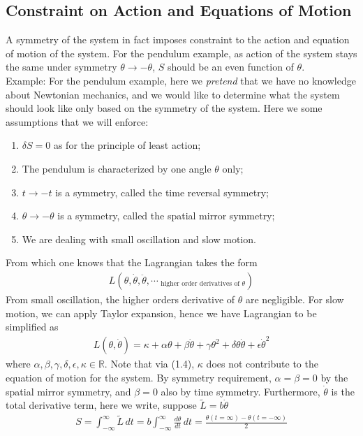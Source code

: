 \documentclass[11pt, onesided]{book}
\theoremstyle{break}
\theoremstyle{break}
\newcommand{\R}{\mathbb{R}}
\newcommand{\that}[1]{\widetilde{#1}}
\newcommand{\example}{\color{green}Example: \color{black}}
\begin{document}
\subsection{Constraint on Action and Equations of Motion}
A symmetry of the system in fact imposes constraint to the action and equation of motion of the system. For the pendulum example, as action of the system stays the same under symmetry $\theta \to -\theta$, $S$ should be an even function of $\theta$. \\

\example For the pendulum example, here we \textit{pretend} that we have no knowledge about Newtonian mechanics, and we would like to determine what the system should look like only based on the symmetry of the system. Here we some assumptions that we will enforce:
\begin{enumerate}[topsep=3pt,itemsep=-1ex,partopsep=1ex,parsep=1ex]
\item $\delta S = 0$ as for the principle of least action;
\item The pendulum is characterized by one angle $\theta$ only;
\item $t \to -t$ is a symmetry, called the time reversal symmetry;
\item $\theta \to -\theta$ is a symmetry, called the spatial mirror symmetry;
\item We are dealing with small oscillation and slow motion.
\end{enumerate}
From which one knows that the Lagrangian takes the form
\begin{align*}
L(\theta, \dot{\theta}, \ddot{\theta},\cdots_\text{\ \ higher order derivatives of $\theta$} )
\end{align*}
From small oscillation, the higher orders derivative of $\theta$ are negligible. For slow motion, we can apply Taylor expansion, hence we have Lagrangian to be simplified as
\begin{align*}
L(\theta,\dot{\theta}) = \kappa + \alpha\theta +\beta\dot{\theta} + \gamma\theta^2 + \delta\theta \dot{\theta} + \epsilon\dot{\theta}^2
\end{align*}
 where $\alpha,\beta, \gamma, \delta, \epsilon, \kappa \in \R$. Note that via (1.4), $\kappa$ does not contribute to the equation of motion for the system. By symmetry requirement, $\alpha=\beta = 0$ by the spatial mirror symmetry, and $\beta = 0$ also by time symmetry. Furthermore, $\dot{\theta}$ is the total derivative term, here we write, suppose $\that{L} = b \dot{\theta}$
 \begin{align*}
 S = \int_{-\infty}^\infty \that{L} \,dt = b \int_{-\infty}^\infty \frac{d\theta}{dt}\, dt = \frac{\theta(t= \infty) - \theta(t = -\infty)}{2}	
 \end{align*}
\end{document}

